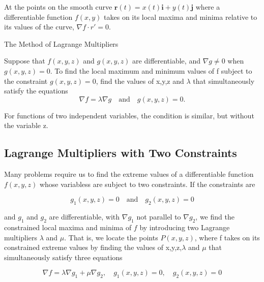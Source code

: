 \documentclass[12pt,a4paper]{article}
\newenvironment{corollary}{\begin{corollarybox}}{\end{corollarybox}\vspace{1\baselineskip}}
\newenvironment{ruleBox}[1]{\begin{rulebox}{#1}}{\end{rulebox}\vspace{1\baselineskip}}
\newenvironment{mynote}{\vspace{1\baselineskip}\begin{note}}{\end{note}\vspace{1\baselineskip}}
\begin{document}
\begin{corollary}
    At the points on the smooth curve \(\mathbf{r}(t) = x(t)\mathbf{i} + y(t)\mathbf{j}\) where a differentiable function \(f(x,y)\) takes on its local maxima and minima relative to its values of the curve, \(\nabla f \cdot r' = 0\).


\end{corollary}


\begin{ruleBox}{The Method of Lagrange Multipliers}
    
    Suppose that \( f(x,y,z) \) and \( g(x,y,z) \) are differentiable, and \( \nabla g \neq 0 \) when \( g(x,y,z) = 0 \).
    To find the local maximum and minimum values of f subject to the constraint \(g(x,y,z) = 0\), find the values of x,y,z and \(\lambda\) that 
    simultaneously satisfy the equations
    \[\nabla f = \lambda \nabla g \quad \text{and} \quad g(x,y,z) = 0.\]

    For functions of two independent variables, the condition is similar, but without the variable z.

    
\end{ruleBox}



\subsection{Lagrange Multipliers with Two Constraints}

Many problems require us to find the extreme values of a differentiable function \(f(x,y,z)\) whose variabless are subject to two constraints. If the constraints are 

\[g_1(x,y,z) = 0 \quad \text{and} \quad g_2(x,y,z) = 0\]

and \(g_1\) and \(g_2\) are differentiable, with \(\nabla g_1\) not parallel to \(\nabla g_2\), we find the constrained local maxima and minima of \(f\) by introducing two Lagrange multipliers \(\lambda\) and \(\mu\).
That is, we locate the points \(P(x,y,z)\), where f takes on its constrained extreme values by finding the values of x,y,z,\(\lambda\) and \(\mu\) that simultaneously satisfy three equations


\begin{mynote}
    \[\nabla f = \lambda \nabla g_1 + \mu \nabla g_2, \quad g_1(x,y,z) = 0, \quad  g_2(x,y,z) = 0 \]

\end{mynote}
\end{document}
